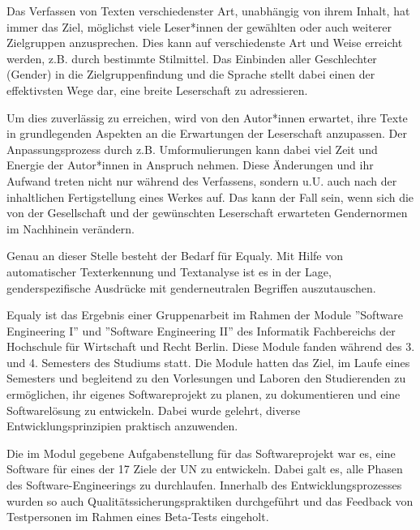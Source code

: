 Das Verfassen von Texten verschiedenster Art, unabhängig von ihrem Inhalt, hat immer das Ziel, möglichst viele Leser*innen der gewählten oder auch weiterer Zielgruppen anzusprechen. Dies kann auf verschiedenste Art und Weise erreicht werden, z.B. durch bestimmte Stilmittel. Das Einbinden aller Geschlechter (Gender) in die Zielgruppenfindung und die Sprache stellt dabei einen der effektivsten Wege dar, eine breite Leserschaft zu adressieren.

Um dies zuverlässig zu erreichen, wird von den Autor*innen erwartet, ihre Texte in grundlegenden Aspekten an die Erwartungen der Leserschaft anzupassen. Der Anpassungsprozess durch z.B. Umformulierungen kann dabei viel Zeit und Energie der Autor*innen in Anspruch nehmen. Diese Änderungen und ihr Aufwand treten nicht nur während des Verfassens, sondern u.U. auch nach der inhaltlichen Fertigstellung eines Werkes auf. Das kann der Fall sein, wenn sich die von der Gesellschaft und der gewünschten Leserschaft erwarteten Gendernormen im Nachhinein verändern.

Genau an dieser Stelle besteht der Bedarf für Equaly. Mit Hilfe von automatischer Texterkennung und Textanalyse ist es in der Lage, genderspezifische Ausdrücke mit genderneutralen Begriffen auszutauschen. 

Equaly ist das Ergebnis einer Gruppenarbeit im Rahmen der Module  ''Software Engineering I'' und ''Software Engineering II'' des Informatik Fachbereichs der Hochschule für Wirtschaft und Recht Berlin.
Diese Module fanden während des 3. und 4. Semesters des Studiums statt. Die Module hatten das Ziel, im Laufe eines Semesters und begleitend zu den Vorlesungen und Laboren den Studierenden zu ermöglichen, ihr eigenes Softwareprojekt zu planen, zu dokumentieren und eine Softwarelösung zu entwickeln.
Dabei wurde gelehrt, diverse Entwicklungsprinzipien praktisch anzuwenden.

Die im Modul gegebene Aufgabenstellung für das Softwareprojekt war es, eine Software für eines der 17 Ziele der UN zu entwickeln. Dabei galt es, alle Phasen des Software-Engineerings zu durchlaufen. Innerhalb des Entwicklungsprozesses wurden so auch Qualitätssicherungspraktiken durchgeführt und das Feedback von Testpersonen im Rahmen eines Beta-Tests eingeholt.
